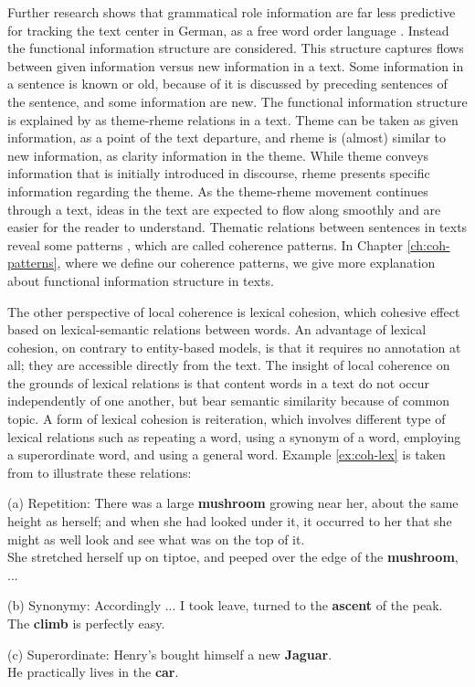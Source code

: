 Further research shows that grammatical role information are far less predictive for tracking the text center in German, as a free word order language \cite{strube.acl96}. 
Instead the functional information structure \cite{danes74} are considered. 
This structure captures flows between given information versus new information in a text. 
Some information in a sentence is known or old, because of it is discussed by preceding sentences of the sentence, and some information are new. 
The functional information structure is explained by  as theme-rheme relations in a text. 
Theme can be taken as given information, as a point of the text departure, and rheme is (almost) similar to new information, as clarity information in the theme. 
While theme conveys information that is initially introduced in discourse, rheme presents specific 
information regarding the theme. 
As the theme-rheme movement continues through a text, ideas in the text are expected to flow along smoothly and are easier for the reader to understand. 
Thematic relations between sentences in texts reveal some patterns \cite{danes74}, which are called  coherence patterns.
In Chapter \ref{ch:coh-patterns}, where we define our coherence patterns, we give more explanation about functional information structure \cite{danes74} in texts. 

The other perspective of local coherence is lexical cohesion, which cohesive effect based on lexical-semantic relations between words. 
An advantage of lexical cohesion, on contrary to entity-based models, is that it requires no annotation at all; they are accessible directly from the text. 
The insight of local coherence on the grounds of lexical relations is that content words in a text do not occur independently of one another, but bear semantic similarity because of common topic. 
A form of lexical cohesion is reiteration, which involves different type of lexical relations such as repeating a word, using a synonym of a word, employing a superordinate word, and using a general word. 
Example \ref{ex:coh-lex} is taken from \cite{halliday76} to illustrate these relations:

\begin{examples}
	\label{ex:coh-lex}
	(a) Repetition: There was a large \textbf{mushroom} growing near her, about the same height as herself; and when she had looked under it, it occurred to her that she might as well look and see what was on the top of it.\\
	She stretched herself up on tiptoe, and peeped over the edge of the \textbf{mushroom}, ... 

	(b) Synonymy: Accordingly ... I took leave, turned to the \textbf{ascent} of the peak. \\
	The \textbf{climb} is perfectly easy. 

	(c) Superordinate: Henry's bought himself a new \textbf{Jaguar}. \\
	He practically lives in the \textbf{car}. 

\end{examples} 

